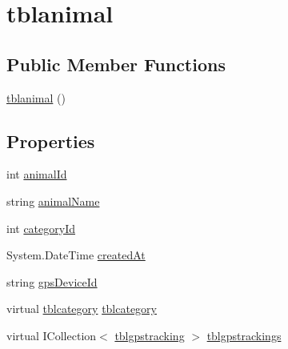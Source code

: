 \hypertarget{classWildLifeTracker_1_1tblanimal}{}\section{tblanimal}
\label{classWildLifeTracker_1_1tblanimal}
\subsection*{Public Member Functions}
\begin{DoxyCompactItemize}
\item 
\hyperlink{classWildLifeTracker_1_1tblanimal_a076509de34d3d07100194a5dd3f191c9}{tblanimal} ()
\end{DoxyCompactItemize}
\subsection*{Properties}
\begin{DoxyCompactItemize}
\item 
int \hyperlink{classWildLifeTracker_1_1tblanimal_a99787b9867ae390df467a99040589a55}{animal\+Id}
\item 
string \hyperlink{classWildLifeTracker_1_1tblanimal_afd38ba6641283469fc9e94212467f9a2}{animal\+Name}
\item 
int \hyperlink{classWildLifeTracker_1_1tblanimal_a423f91c56dc35040d661cfbe357f7c78}{category\+Id}
\item 
System.\+Date\+Time \hyperlink{classWildLifeTracker_1_1tblanimal_a0da6329d5fbb1b91739557ad49ece9c0}{created\+At}
\item 
string \hyperlink{classWildLifeTracker_1_1tblanimal_a073b88a9702ca0513fa534f58a048070}{gps\+Device\+Id}
\item 
virtual \hyperlink{classWildLifeTracker_1_1tblcategory}{tblcategory} \hyperlink{classWildLifeTracker_1_1tblanimal_aea411632582d5ca6da0cfd6f0b3eadfd}{tblcategory}
\item 
virtual I\+Collection$<$ \hyperlink{classWildLifeTracker_1_1tblgpstracking}{tblgpstracking} $>$ \hyperlink{classWildLifeTracker_1_1tblanimal_af00c7cc8fc89df2b998c54b894a5d5c5}{tblgpstrackings}
\end{DoxyCompactItemize}


